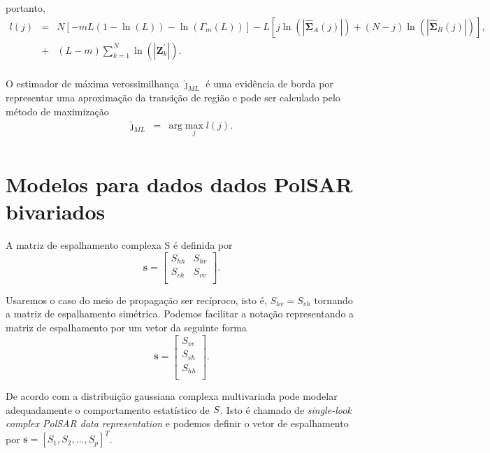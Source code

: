 portanto, 
\begin{equation}\label{cap_acf_21}
\begin{array}{rcl}
	l(j)&=&N\left[-mL(1-\ln{\left(L\right)})-\ln{\left(\Gamma_m(L)\right)}\right]-L\left[j\ln{\left(|\mathbf{\widehat{\Sigma}}_{A}(j)|\right)} +(N-j)\ln{\left(|\mathbf{\widehat{\Sigma}}_{B}(j)|\right)}\right], \\
	&+&(L-m)\sum_{k=1}^{N}\ln{\left(|\mathbf{Z}_{k}^{'}|\right)}. \\
\end{array}
\end{equation}

O estimador de máxima verossimilhança $\widehat{\jmath}_{ML}$ é uma evidência de borda por representar uma aproximação da transição de região e pode ser calculado pelo método de maximização
\begin{equation}\label{cap_acf_22}
\begin{array}{rcl}
	\widehat{\jmath}_{ML}&=&\text{arg}\max\limits_{j}l(j).  \\
\end{array}
\end{equation}
\section{Modelos para dados dados PolSAR bivariados}

A matriz de espalhamento complexa {\boldmath S} é definida por
$$
\mathbf{ s} = \left[
\begin{array}{cc}
	S_{hh}   & S_{hv}   \\
	S_{vh}   & S_{vv}   \\
\end{array}
\right].
$$

Usaremos o caso do meio de propagação ser recíproco, isto é, $S_{hv}=S_{vh}$ tornando a matriz de espalhamento simétrica. Podemos facilitar a notação representando a matriz de espalhamento por um vetor da seguinte forma
$$
\mathbf{s} = \left[
\begin{array}{c}
	S_{vv}      \\
	S_{vh}     \\
	S_{hh}      \\
\end{array}
\right].
$$

De acordo com \cite{good} a distribuição gaussiana complexa multivariada pode modelar adequadamente o comportamento estatístico de $\boldmath S$. Isto é chamado de {\it single-look complex PolSAR data representation} e podemos definir o vetor de espalhamento por $\mathbf{s}=[S_1,S_2,\dots,S_p]^T$. 

